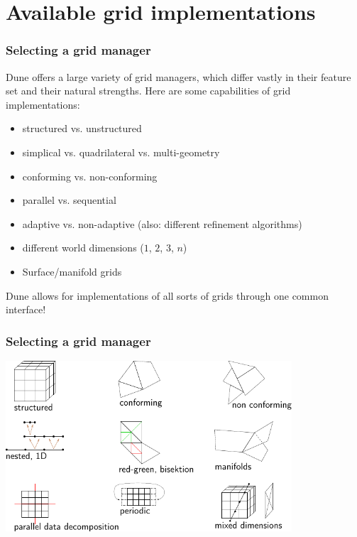 \documentclass[aspectratio=169,11pt]{beamer}
\theoremstyle{definition}
\begin{document}
\section{Available grid implementations}

\begin{frame}
 \frametitle{Selecting a grid manager}

 Dune offers a large variety of grid managers, which differ vastly in their feature set and their natural strengths.
 Here are some capabilities of grid implementations:
 \begin{itemize}
  \item structured vs. unstructured
  \item simplical vs. quadrilateral vs. multi-geometry
  \item conforming vs. non-conforming
  \item parallel vs. sequential
  \item adaptive vs. non-adaptive (also: different refinement algorithms)
  \item different world dimensions ($1$, $2$, $3$, $n$)
  \item Surface/manifold grids
 \end{itemize}

 Dune allows for implementations of all sorts of grids through one common interface!
\end{frame}

\begin{frame}
 \frametitle{Selecting a grid manager}
 \centering
 \includegraphics[width=0.8\textwidth]{figures/io/grids.pdf}
\end{frame}
\end{document}

